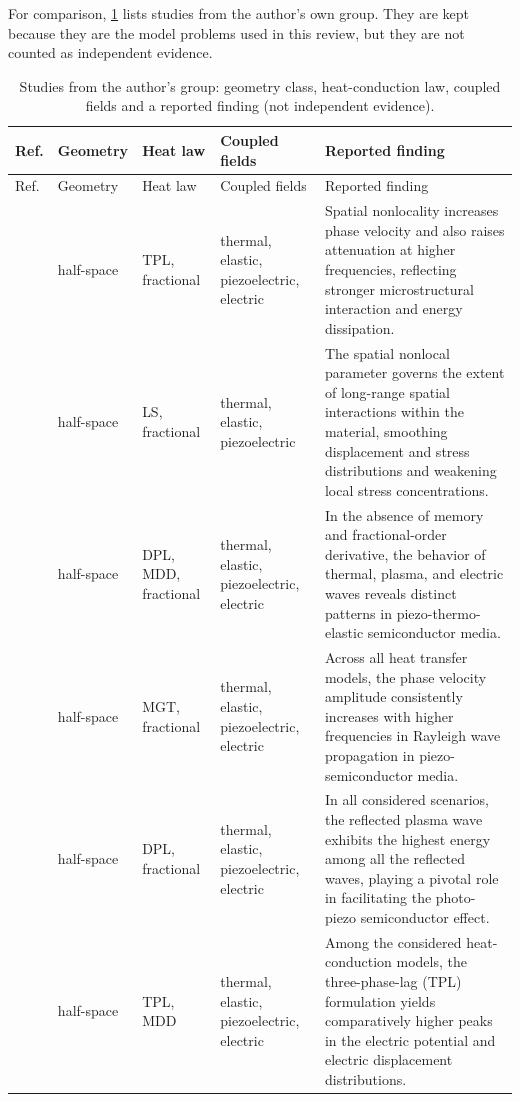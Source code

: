 For comparison, \cref{tab:atlas-own} lists studies from the author's own group. They are kept because they are the model problems used in this review, but they are not counted as independent evidence.

{\footnotesize
\begin{longtable}{p{1.9cm}p{2.0cm}p{1.7cm}p{2.6cm}p{5.0cm}}
\caption{Studies from the author's group: geometry class, heat-conduction law, coupled fields and a reported finding (not independent evidence).}\label{tab:atlas-own}\\
\toprule
Ref. & Geometry & Heat law & Coupled fields & Reported finding \\
\midrule
\endfirsthead
\toprule
Ref. & Geometry & Heat law & Coupled fields & Reported finding \\
\midrule
\endhead
\bottomrule
\endfoot
\citet{Aldandani2026} & half-space & TPL, fractional & thermal, elastic, piezoelectric, electric & Spatial nonlocality increases phase velocity and also raises attenuation at higher frequencies, reflecting stronger microstructural interaction and energy dissipation. \\
\citet{Das2026} & half-space & LS, fractional & thermal, elastic, piezoelectric & The spatial nonlocal parameter governs the extent of long-range spatial interactions within the material, smoothing displacement and stress distributions and weakening local stress concentrations. \\
\citet{Gupta2023} & half-space & DPL, MDD, fractional & thermal, elastic, piezoelectric, electric & In the absence of memory and fractional-order derivative, the behavior of thermal, plasma, and electric waves reveals distinct patterns in piezo-thermo-elastic semiconductor media. \\
\citet{Gupta2024} & half-space & MGT, fractional & thermal, elastic, piezoelectric, electric & Across all heat transfer models, the phase velocity amplitude consistently increases with higher frequencies in Rayleigh wave propagation in piezo-semiconductor media. \\
\citet{Gupta2024a} & half-space & DPL, fractional & thermal, elastic, piezoelectric, electric & In all considered scenarios, the reflected plasma wave exhibits the highest energy among all the reflected waves, playing a pivotal role in facilitating the photo-piezo semiconductor effect. \\
\citet{Gupta2026HeatMap} & half-space & TPL, MDD & thermal, elastic, piezoelectric, electric & Among the considered heat-conduction models, the three-phase-lag (TPL) formulation yields comparatively higher peaks in the electric potential and electric displacement distributions. \\

\end{longtable}}
